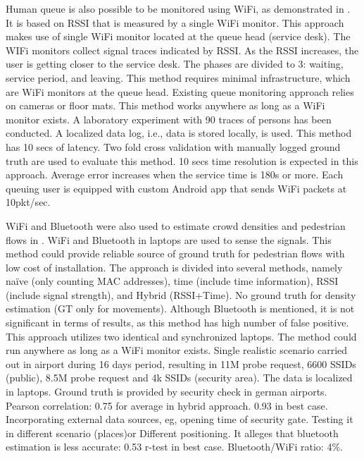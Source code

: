 \documentclass{article}
\begin{document}
Human queue is also possible to be monitored using WiFi, as demonstrated in \cite{thesis012}. It is based on RSSI that is measured by a single WiFi monitor. This approach makes use of single WiFi monitor located at the queue head (service desk). The WIFi monitors collect signal traces indicated by RSSI. As the RSSI increases, the user is getting closer to the service desk. The phases are divided to 3: waiting, service period, and leaving. This method requires minimal infrastructure, which are WiFi monitors at the queue head. Existing queue monitoring approach relies on cameras or floor mats. This method works anywhere as long as a WiFi monitor exists. A laboratory experiment with 90 traces of persons has been conducted. A localized data log, i.e., data is stored locally, is used. This method has 10 secs of latency. Two fold cross validation with manually logged ground truth are used to evaluate this method. 10 secs time resolution is expected in this approach. Average error increases when the service time is 180s or more. Each queuing user is equipped with custom Android app that sends WiFi packets at 10pkt/sec.

WiFi and Bluetooth were also used to estimate crowd densities and pedestrian flows in \cite{thesis011}. WiFi and Bluetooth in laptops are used to sense the signals. This method could provide reliable source of ground truth for pedestrian flows with low cost of installation. The approach is divided into several methods, namely na\"{i}ve (only counting MAC addresses), time (include time information), RSSI (include signal strength), and Hybrid (RSSI+Time). No ground truth for density estimation (GT only for movements). Although Bluetooth is mentioned, it is not significant in terms of results, as this method has high number of false positive. This approach utilizes two identical and synchronized laptops. The method could run anywhere as long as a WiFi monitor exists. Single realistic scenario carried out in airport during 16 days period, resulting in 11M probe request, 6600 SSIDs (public), 8.5M probe request and 4k SSIDs (security area). The data is localized in laptops. Ground truth is provided by security check in german airports. Pearson correlation: 0.75 for average in hybrid approach. 0.93 in best case. Incorporating external data sources, eg, opening time of security gate. Testing it in different scenario (places)or Different positioning. It alleges that bluetooth estimation is less accurate: 0.53 r-test in best case. Bluetooth/WiFi ratio: 4\%.
\end{document}
